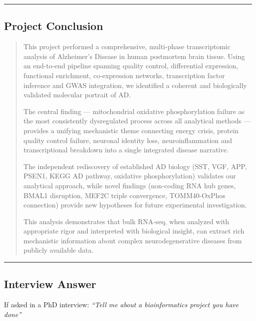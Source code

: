 \documentclass[
]{article}
\begin{document}
\begin{center}\rule{0.5\linewidth}{0.5pt}\end{center}

\subsection{Project Conclusion}\label{project-conclusion}

\begin{quote}
This project performed a comprehensive, multi-phase transcriptomic
analysis of Alzheimer's Disease in human postmortem brain tissue. Using
an end-to-end pipeline spanning quality control, differential
expression, functional enrichment, co-expression networks, transcription
factor inference and GWAS integration, we identified a coherent and
biologically validated molecular portrait of AD.

The central finding --- mitochondrial oxidative phosphorylation failure
as the most consistently dysregulated process across all analytical
methods --- provides a unifying mechanistic theme connecting energy
crisis, protein quality control failure, neuronal identity loss,
neuroinflammation and transcriptional breakdown into a single integrated
disease narrative.

The independent rediscovery of established AD biology (SST, VGF, APP,
PSEN1, KEGG AD pathway, oxidative phosphorylation) validates our
analytical approach, while novel findings (non-coding RNA hub genes,
BMAL1 disruption, MEF2C triple convergence, TOMM40-OxPhos connection)
provide new hypotheses for future experimental investigation.

This analysis demonstrates that bulk RNA-seq, when analyzed with
appropriate rigor and interpreted with biological insight, can extract
rich mechanistic information about complex neurodegenerative diseases
from publicly available data.
\end{quote}

\begin{center}\rule{0.5\linewidth}{0.5pt}\end{center}

\subsection{Interview Answer}\label{interview-answer}

If asked in a PhD interview: \emph{``Tell me about a bioinformatics
project you have done''}
\end{document}
